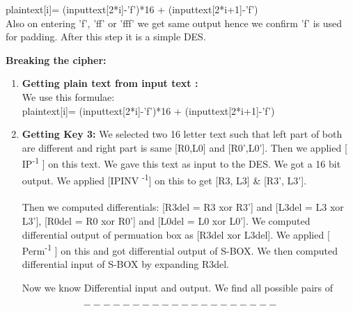 \documentclass[11pt]{article}
\begin{document}
plaintext[i]= (inputtext[2*i]-'f')*16 + (inputtext[2*i+1]-'f')\\

Also on entering 'f', 'ff' or 'fff' we get same output hence we confirm 'f' is used for padding.
After this step it is a simple DES.



\medskip


\pagebreak

\textbf{Breaking the cipher: }

\begin{enumerate}
  \item \textbf{Getting plain text from input text : }
  \\
 We use this formulae:\\
 plaintext[i]= (inputtext[2*i]-'f')*16 + (inputtext[2*i+1]-'f')\\
 
 


 \item \textbf{Getting Key 3: }
  We selected two 16 letter text such that left part of both are different and right part is same [R0,L0] and [R0',L0']. Then we applied [ IP\textsuperscript{-1} ] on this text. We gave this text as input to the DES. We got a 16 bit output. We applied [IPINV \textsuperscript{-1}] on this to get [R3, L3] & [R3', L3'].  
\\\\
Then we computed differentials: [R3del = R3 xor R3'] and [L3del = L3 xor L3'], [R0del = R0 xor R0'] and [L0del = L0 xor L0']. We computed differential output of permuation box as [R3del xor L3del]. We applied [ Perm\textsuperscript{-1} ] on this and got differential output of S-BOX. We then computed differential input of S-BOX by expanding R3del. 

Now we know Differential input and output. We find all possible pairs of 
  
\end{enumerate}

$$--------------------$$
\end{document}
